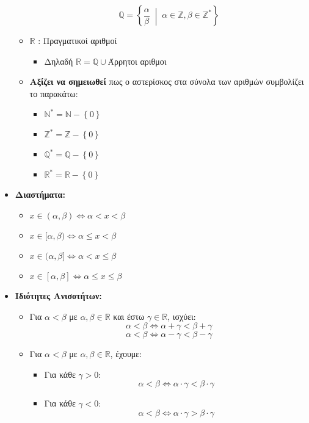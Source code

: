 \documentclass[a4paper,12pt]{article}
\begin{document}
\begin{itemize}[leftmargin=1em]
\begin{itemize}
        \[
        \mathbb{Q} = \left\{ \frac{\alpha}{\beta} \;\middle|\; \alpha \in \mathbb{Z}, \beta \in \mathbb{Z}^* \right\}
        \]

        \item $\mathbb{R}$ : Πραγματικοί αριθμοί
        \begin{itemize}
            \item Δηλαδή $\mathbb{R} = \mathbb{Q}\cup$Άρρητοι αριθμοι
        \end{itemize}

        \item \textbf{Αξίζει να σημειωθεί} πως ο αστερίσκος στα σύνολα των αριθμών συμβολίζει το παρα\-κάτω:
        \begin{itemize}
            \item $\mathbb{N}^* = \mathbb{N} - \left\{ 0 \right\}$
            \item $\mathbb{Z}^* = \mathbb{Z} - \left\{ 0 \right\}$
            \item $\mathbb{Q}^* = \mathbb{Q} - \left\{ 0 \right\}$
            \item $\mathbb{R}^* = \mathbb{R} - \left\{ 0 \right\}$
        \end{itemize}


    \end{itemize}

    \item \textbf{Διαστήματα:}
    \begin{itemize}
        \item $x \in ( \alpha, \beta) \iff \alpha < x < \beta$
        \item $x \in [ \alpha, \beta) \iff \alpha \leq x < \beta$
        \item $x \in ( \alpha, \beta] \iff \alpha < x \leq \beta$
        \item $x \in [ \alpha, \beta] \iff \alpha \leq x \leq \beta$
    \end{itemize}

\newpage

    \item \textbf{Ιδιότητες Ανισοτήτων:}
    \begin{itemize}
        \item Για $\alpha < \beta$ με $\alpha, \beta \in \mathbb{R}$ και έστω $\gamma \in \mathbb{R}$, ισχύει:
        \[
        \alpha < \beta \iff \alpha + \gamma < \beta + \gamma
        \]
        \[
        \alpha < \beta \iff \alpha - \gamma < \beta - \gamma
        \]

        \item Για $\alpha < \beta$ με $\alpha, \beta \in \mathbb{R}$, έχουμε:
        \begin{itemize}
            \item Για κάθε $\gamma > 0$:
            \[
            \alpha < \beta \iff \alpha \cdot \gamma < \beta \cdot \gamma
            \]
            \item Για κάθε $\gamma < 0$:
            \[
            \alpha < \beta \iff \alpha \cdot \gamma > \beta \cdot \gamma
            \]
        \end{itemize}


\end{itemize}
\end{itemize}
\end{document}
